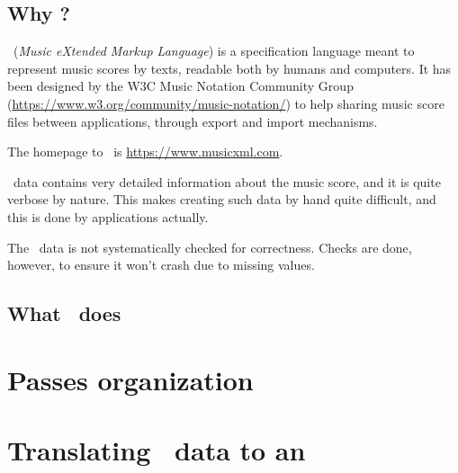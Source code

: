 \documentclass[12pt,a4paper]{article}
\begin{document}
\subsection{Why \xmlToLy?}

\mxml\ ({\it Music eXtended Markup Language}) is a specification language meant to represent music scores by texts, readable both by humans and computers. It has been designed by the W3C Music Notation Community Group (\url{https://www.w3.org/community/music-notation/}) to help sharing music score files between applications, through export and import mechanisms.

The homepage to \mxml\ is \url{https://www.musicxml.com}.

\mxml\ data contains very detailed information about the music score, and it is quite verbose by nature. This makes creating such data by hand quite difficult, and this is done by applications actually.

The \mxml\ data is not systematically checked for correctness. Checks are done, however, to ensure it won't crash due to missing values.


\subsection{What \xmlToLy\ does}


\section{Passes organization}


\section{Translating \mxml\ data to an \mxmlt}
\end{document}

